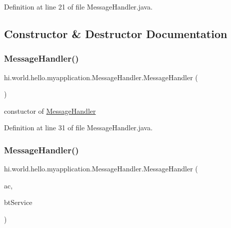 Definition at line 21 of file Message\+Handler.\+java.



\subsection{Constructor \& Destructor Documentation}
\mbox{\label{classhi_1_1world_1_1hello_1_1myapplication_1_1_message_handler_a3f340dbd546df332f2e4872cdbe8157a}} 
\subsubsection{\texorpdfstring{MessageHandler()}{MessageHandler()}\hspace{0.1cm}{\footnotesize\ttfamily [1/2]}}
{\footnotesize\ttfamily hi.\+world.\+hello.\+myapplication.\+Message\+Handler.\+Message\+Handler (\begin{DoxyParamCaption}{ }\end{DoxyParamCaption})}



constuctor of \mbox{\hyperlink{classhi_1_1world_1_1hello_1_1myapplication_1_1_message_handler}{Message\+Handler}} 



Definition at line 31 of file Message\+Handler.\+java.


\begin{DoxyCode}{0}

\end{DoxyCode}
\mbox{\label{classhi_1_1world_1_1hello_1_1myapplication_1_1_message_handler_ae2003b499a79c11ba049ca15df235644}} 
\subsubsection{\texorpdfstring{MessageHandler()}{MessageHandler()}\hspace{0.1cm}{\footnotesize\ttfamily [2/2]}}
{\footnotesize\ttfamily hi.\+world.\+hello.\+myapplication.\+Message\+Handler.\+Message\+Handler (\begin{DoxyParamCaption}\item[{Activity}]{ac,  }\item[{\mbox{\hyperlink{classhi_1_1world_1_1hello_1_1myapplication_1_1_bluetooth_service}{Bluetooth\+Service}}}]{bt\+Service }\end{DoxyParamCaption})}



